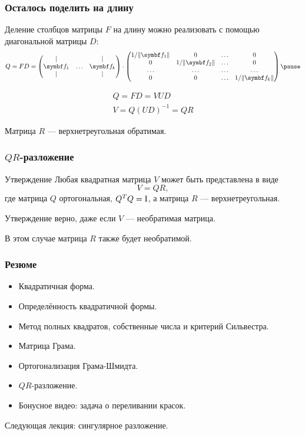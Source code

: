 \begin{frame}
    \frametitle{Осталось поделить на длину}

    Деление столбцов матрицы $F$ на длину можно реализовать с помощью диагональной матрицы $D$: \pause
    \[
    Q = F D  = \begin{pmatrix}
        \vert &  & \vert \\
        \bff_1 & \ldots & \bff_k \\
        \vert &  & \vert \\
    \end{pmatrix}  \cdot \begin{pmatrix}
        1/ \norm{\bff_1} & 0 & \ldots & 0 \\
0 & 1/ \norm{\bff_2} & \ldots & 0 \\
\ldots & \ldots & \ldots & \ldots \\
0 & 0 & \ldots & 1/ \norm{\bff_k} \\
    \end{pmatrix} \pause
    \]

    \[
    \begin{array}{l}
    Q = FD = VUD \\
    V = Q(UD)^{-1} = QR
    \end{array}
    \]
    
    Матрица $R$ — верхнетреугольная обратимая.


\end{frame}


\begin{frame}
    \frametitle{$QR$-разложение}

    \begin{block}{Утверждение}
        Любая квадратная матрица $V$ может быть представлена в виде
        \[
        V = QR, 
        \]
        где матрица $Q$ ортогональная, $Q^T Q= \mathrm{I}$, а матрица $R$ — верхнетреугольная. \pause
    \end{block}
    
    Утверждение верно, даже если $V$ — необратимая матрица.

    В этом случае матрица $R$ также будет необратимой.

\end{frame}


\begin{frame}
    \frametitle{Резюме}

    \begin{itemize}[<+->]
    \item Квадратичная форма.
    \item Определённость квадратичной формы.
    \item Метод полных квадратов, собственные числа и критерий Сильвестра.
    \item Матрица Грама.
    \item Ортогонализация Грама-Шмидта.
    \item $QR$-разложение.
    \item Бонусное видео: задача о переливании красок.
    \end{itemize}
    \pause
    \alert{Следующая лекция:} сингулярное разложение.
        


\end{frame}